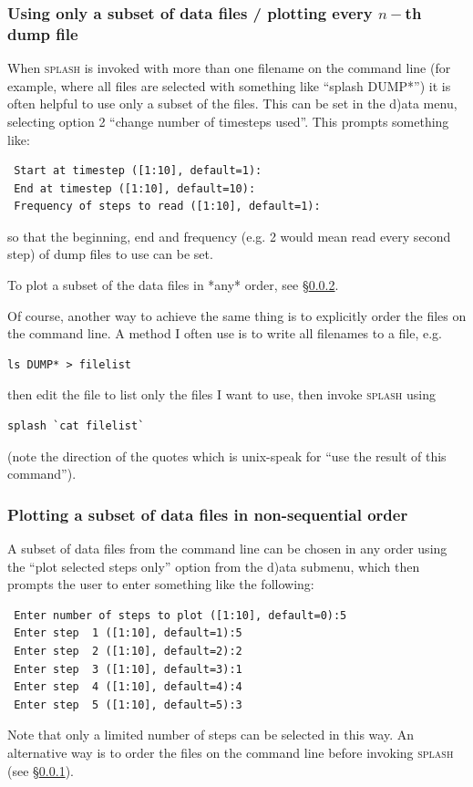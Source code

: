 \documentclass[a4paper,10pt]{article}
\newcommand{\splash}{\textsc{splash }}
\begin{document}
\subsubsection{ Using only a subset of data files / plotting every $n-$th dump file}
\label{sec:subsetofsteps}
 When \splash is invoked with more than one filename on the command line (for example, where all files are selected with something like ``splash DUMP*'') it is often helpful to use only a subset of the files. This can be set in the d)ata menu, selecting option 2 ``change number of timesteps used''. This prompts something like:
\begin{verbatim}
 Start at timestep ([1:10], default=1):
 End at timestep ([1:10], default=10):
 Frequency of steps to read ([1:10], default=1):
\end{verbatim}
so that the beginning, end and frequency (e.g. 2 would mean read every second step) of dump files to use can be set.

 To plot a subset of the data files in *any* order, see \S\ref{sec:selectedstepsonly}. 

 Of course, another way to achieve the same thing is to explicitly order the files on the command line. A method I often use is to write all filenames to a file, e.g. 
\begin{verbatim}
ls DUMP* > filelist
\end{verbatim}
then edit the file to list only the files I want to use, then invoke \splash using
\begin{verbatim}
splash `cat filelist`
\end{verbatim}
(note the direction of the quotes which is unix-speak for ``use the result of this command''). 

\subsubsection{ Plotting a subset of data files in non-sequential order}
\label{sec:selectedstepsonly}
 A subset of data files from the command line can be chosen in any order using the ``plot selected steps only'' option from the d)ata submenu, which then prompts the user to enter something like the following:
\begin{verbatim}
 Enter number of steps to plot ([1:10], default=0):5
 Enter step  1 ([1:10], default=1):5
 Enter step  2 ([1:10], default=2):2
 Enter step  3 ([1:10], default=3):1
 Enter step  4 ([1:10], default=4):4
 Enter step  5 ([1:10], default=5):3
\end{verbatim}
Note that only a limited number of steps can be selected in this way. An alternative way is to order the files on the command line before invoking \splash (see \S\ref{sec:subsetofsteps}). 
\end{document}

